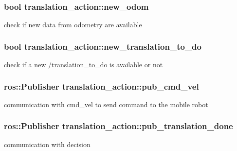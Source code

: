 \subsubsection[{\texorpdfstring{new\+\_\+odom}{new_odom}}]{\setlength{\rightskip}{0pt plus 5cm}bool translation\+\_\+action\+::new\+\_\+odom\hspace{0.3cm}{\ttfamily [private]}}\hypertarget{classtranslation__action_aeb14a0c0ae0c7b25150d20752b587c3c}{}\label{classtranslation__action_aeb14a0c0ae0c7b25150d20752b587c3c}
check if new data from odometry are available 
\subsubsection[{\texorpdfstring{new\+\_\+translation\+\_\+to\+\_\+do}{new_translation_to_do}}]{\setlength{\rightskip}{0pt plus 5cm}bool translation\+\_\+action\+::new\+\_\+translation\+\_\+to\+\_\+do\hspace{0.3cm}{\ttfamily [private]}}\hypertarget{classtranslation__action_ac46c0be691bf4f3a281dc5295718a672}{}\label{classtranslation__action_ac46c0be691bf4f3a281dc5295718a672}
check if a new /translation\+\_\+to\+\_\+do is available or not 
\subsubsection[{\texorpdfstring{pub\+\_\+cmd\+\_\+vel}{pub_cmd_vel}}]{\setlength{\rightskip}{0pt plus 5cm}ros\+::\+Publisher translation\+\_\+action\+::pub\+\_\+cmd\+\_\+vel\hspace{0.3cm}{\ttfamily [private]}}\hypertarget{classtranslation__action_a1a4a9e78d808b6d86ca8f59a510b7639}{}\label{classtranslation__action_a1a4a9e78d808b6d86ca8f59a510b7639}
communication with cmd\+\_\+vel to send command to the mobile robot 
\subsubsection[{\texorpdfstring{pub\+\_\+translation\+\_\+done}{pub_translation_done}}]{\setlength{\rightskip}{0pt plus 5cm}ros\+::\+Publisher translation\+\_\+action\+::pub\+\_\+translation\+\_\+done\hspace{0.3cm}{\ttfamily [private]}}\hypertarget{classtranslation__action_a8e07db9c45af311e71fe1927b6aeb424}{}\label{classtranslation__action_a8e07db9c45af311e71fe1927b6aeb424}
communication with decision 
